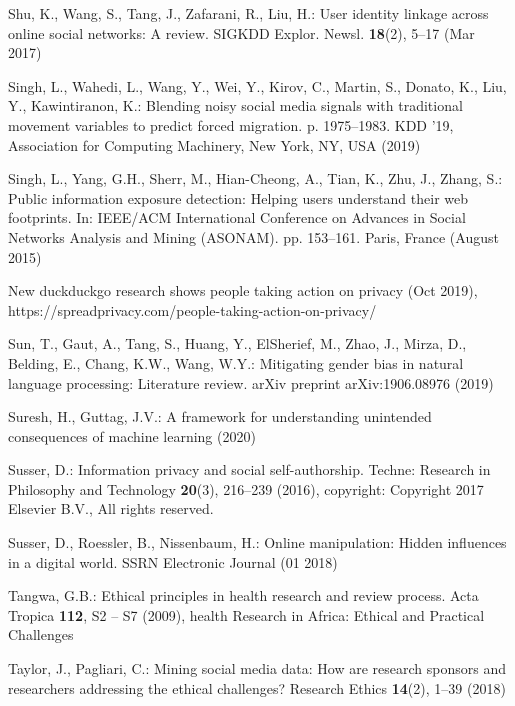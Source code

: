 \documentclass[11pt]{article} %
\begin{document}
\begin{thebibliography}{10}
\begin{small}
Shu, K., Wang, S., Tang, J., Zafarani, R., Liu, H.: User identity linkage
  across online social networks: A review. SIGKDD Explor. Newsl.
  \textbf{18}(2),  5–17 (Mar 2017)

Singh, L., Wahedi, L., Wang, Y., Wei, Y., Kirov, C., Martin, S., Donato, K.,
  Liu, Y., Kawintiranon, K.: Blending noisy social media signals with
  traditional movement variables to predict forced migration. p. 1975–1983.
  KDD '19, Association for Computing Machinery, New York, NY, USA (2019)

Singh, L., Yang, G.H., Sherr, M., Hian{-}Cheong, A., Tian, K., Zhu, J., Zhang,
  S.: Public information exposure detection: Helping users understand their web
  footprints. In: {IEEE/ACM} International Conference on Advances in Social
  Networks Analysis and Mining (ASONAM). pp. 153--161. Paris, France (August
  2015)

New duckduckgo research shows people taking action on privacy (Oct 2019),
  https://spreadprivacy.com/people-taking-action-on-privacy/

Sun, T., Gaut, A., Tang, S., Huang, Y., ElSherief, M., Zhao, J., Mirza, D.,
  Belding, E., Chang, K.W., Wang, W.Y.: Mitigating gender bias in natural
  language processing: {Literature} review. arXiv preprint arXiv:1906.08976
  (2019)

Suresh, H., Guttag, J.V.: A framework for understanding unintended consequences
  of machine learning (2020)

Susser, D.: Information privacy and social self-authorship. Techne: Research in
  Philosophy and Technology  \textbf{20}(3),  216--239 (2016), copyright:
  Copyright 2017 Elsevier B.V., All rights reserved.

Susser, D., Roessler, B., Nissenbaum, H.: Online manipulation: Hidden
  influences in a digital world. SSRN Electronic Journal  (01 2018)

Tangwa, G.B.: Ethical principles in health research and review process. Acta
  Tropica  \textbf{112},  S2 -- S7 (2009), health Research in Africa: Ethical
  and Practical Challenges

Taylor, J., Pagliari, C.: Mining social media data: How are research sponsors
  and researchers addressing the ethical challenges? Research Ethics
  \textbf{14}(2),  1--39 (2018)


\end{small}
\end{thebibliography}
\end{document}
